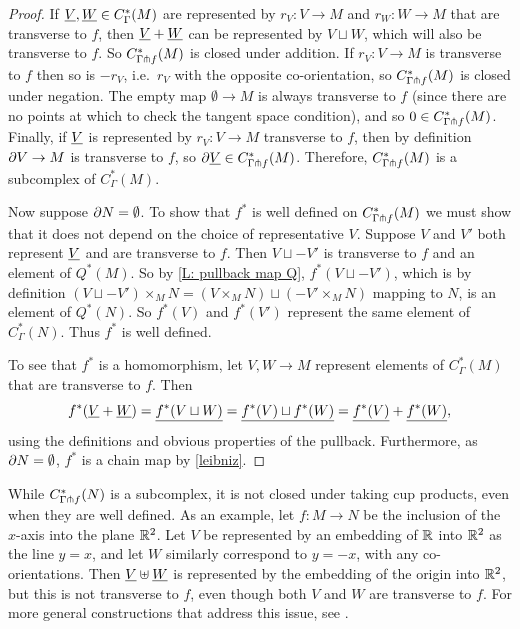 \begin{proof}
	If $\underline{V},\underline{W} \in C^*_\Gamma(M)$ are represented by $r_V \colon V \to M$ and $r_W \colon W \to M$ that are transverse to $f$, then $\underline{V}+\underline{W}$ can be represented by $V \sqcup W$, which will also be transverse to $f$.
	So $C^*_{\Gamma \pitchfork f}(M)$ is closed under addition.
	If $r_V \colon V \to M$ is transverse to $f$ then so is $-r_V$, i.e.\ $r_V$ with the opposite co-orientation, so $C^*_{\Gamma \pitchfork f}(M)$ is closed under negation.
	The empty map $\emptyset \to M$ is always transverse to $f$ (since there are no points at which to check the tangent space condition), and so $0 \in C^*_{\Gamma \pitchfork f}(M)$.
	Finally, if $\underline{V}$ is represented by $r_V \colon V \to M$ transverse to $f$, then by definition $\partial V \to M$ is transverse to $f$, so $\partial \underline{V} \in C^*_{\Gamma \pitchfork f}(M)$.
	Therefore, $C^*_{\Gamma \pitchfork f}(M)$ is a subcomplex of $C^*_{\Gamma}(M)$.

	Now suppose $\partial N = \emptyset$.
	To show that $f^*$ is well defined on $C^*_{\Gamma \pitchfork f}(M)$ we must show that it does not depend on the choice of representative $V$.
	Suppose $V$ and $V'$ both represent $\underline{V}$ and are transverse to $f$.
	Then $V \sqcup -V'$ is transverse to $f$ and an element of $Q^*(M)$.
	So by \cref{L: pullback map Q}, $f^*(V \sqcup -V')$, which is by definition $(V \sqcup -V') \times_M N = (V \times_M N) \sqcup (-V' \times_M N)$ mapping to $N$, is an element of $Q^*(N)$.
	So $f^*(V)$ and $f^*(V')$ represent the same element of $C^*_{\Gamma}(N)$.
	Thus $f^*$ is well defined.

	To see that $f^*$ is a homomorphism, let $V,W \to M$ represent elements of $C^*_{\Gamma}(M)$ that are transverse to $f$.
	Then
	$$f^*(\underline{V}+\underline{W}) = \underline{f^*(V \sqcup W)} = \underline{f^*(V) \sqcup f^*(W)} = \underline{f^*(V)}+\underline{f^*(W)},$$
	using the definitions and obvious properties of the pullback.
	Furthermore, as $\partial N = \emptyset$, $f^*$ is a chain map by \cref{leibniz}.
\end{proof}

\begin{remark}
	While $C^*_{\Gamma \pitchfork f}(N)$ is a subcomplex, it is not closed under taking cup products, even when they are well defined.
	As an example, let $f \colon M \to N$ be the inclusion of the $x$-axis into the plane $\mathbb{R}^2$.
	Let $V$ be represented by an embedding of $\mathbb{R}$ into $\mathbb{R}^2$ as the line $y = x$, and let $W$ similarly correspond to $y = -x$, with any co-orientations.
	Then $\underline{V} \uplus \underline{W}$ is represented by the embedding of the origin into $\mathbb{R}^2$, but this is not transverse to $f$, even though both $V$ and $W$ are transverse to $f$.
	For more general constructions that address this issue, see \cite{GBF47}.
\end{remark}

